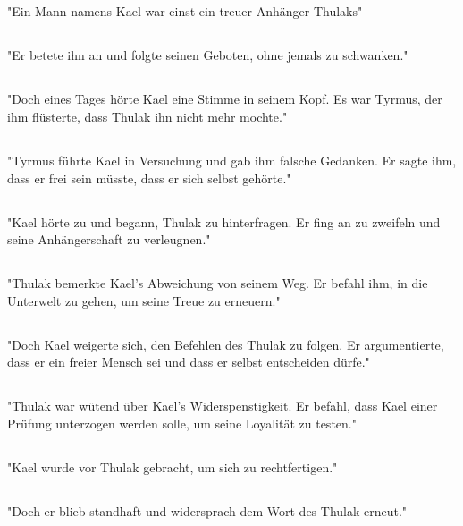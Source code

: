 \documentclass{article}
\begin{document}
\subsection{}
"Ein Mann namens Kael war einst ein treuer Anhänger Thulaks"
\subsection{}
"Er betete ihn an und folgte seinen Geboten, ohne jemals zu schwanken."
\subsection{}
"Doch eines Tages hörte Kael eine Stimme in seinem Kopf. Es war Tyrmus, der ihm flüsterte, dass Thulak ihn nicht mehr mochte."
\subsection{}
"Tyrmus führte Kael in Versuchung und gab ihm falsche Gedanken. Er sagte ihm, dass er frei sein müsste, dass er sich selbst gehörte."
\subsection{}
"Kael hörte zu und begann, Thulak zu hinterfragen. Er fing an zu zweifeln und seine Anhängerschaft zu verleugnen."
\subsection{}
"Thulak bemerkte Kael's Abweichung von seinem Weg. Er befahl ihm, in die Unterwelt zu gehen, um seine Treue zu erneuern."
\subsection{}
"Doch Kael weigerte sich, den Befehlen des Thulak zu folgen. Er argumentierte, dass er ein freier Mensch sei und dass er selbst entscheiden dürfe."
\subsection{}
"Thulak war wütend über Kael's Widerspenstigkeit. Er befahl, dass Kael einer Prüfung unterzogen werden solle, um seine Loyalität zu testen."
\subsection{}
"Kael wurde vor Thulak gebracht, um sich zu rechtfertigen."
\subsection{}
"Doch er blieb standhaft und widersprach dem Wort des Thulak erneut."
\end{document}
